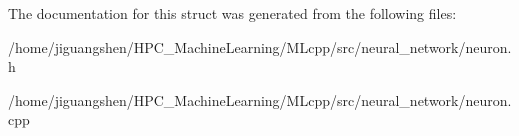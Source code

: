 The documentation for this struct was generated from the following files\-:\begin{DoxyCompactItemize}
\item 
/home/jiguangshen/\-H\-P\-C\-\_\-\-Machine\-Learning/\-M\-Lcpp/src/neural\-\_\-network/neuron.\-h\item 
/home/jiguangshen/\-H\-P\-C\-\_\-\-Machine\-Learning/\-M\-Lcpp/src/neural\-\_\-network/neuron.\-cpp\end{DoxyCompactItemize}

